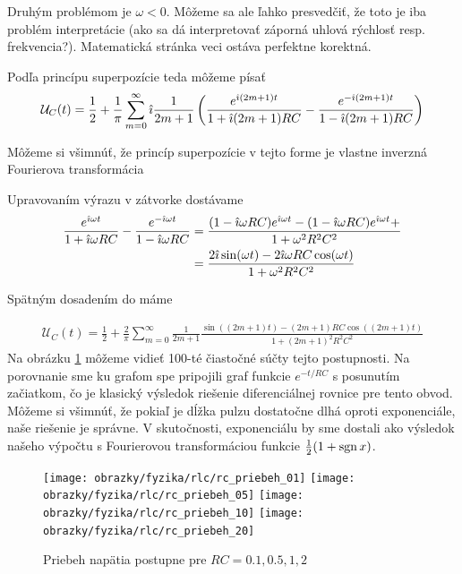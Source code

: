 Druhým problémom je $\omega<0$. Môžeme sa ale ľahko presvedčiť, že
toto je iba problém interpretácie (ako sa dá interpretovať záporná
uhlová rýchlosť resp. frekvencia?). Matematická stránka veci ostáva
perfektne korektná.

Podľa princípu superpozície teda môžeme písať
\begin{align}
    \mathcal{U}_C(t) = \frac{1}{2} +
        \frac{1}{\pi} \sum_{m=0}^{\infty}
            \hat{\imath} \frac{1}{2m+1} \left(
                \frac{e^{\hat{\imath} (2m+1) t} }{1 + \hat{\imath} (2m+1) RC} -
                \frac{e^{- \hat{\imath} (2m+1) t} }{1 - \hat{\imath} (2m+1) RC}
            \right)
\end{align}
\begin{poznamka}
    Môžeme si všimnúť, že princíp superpozície v tejto forme je
    vlastne inverzná Fourierova transformácia
\end{poznamka}
Upravovaním výrazu v zátvorke dostávame
\begin{equation}
    \begin{split}
    \frac{e^{\hat{\imath} \omega t}}{1 + \hat{\imath} \omega RC} -
    \frac{e^{- \hat{\imath} \omega t}}{1 - \hat{\imath} \omega RC}  &= 
    \frac{ (1-\hat{\imath} \omega RC) e^{\hat{\imath} \omega t} -
           (1-\hat{\imath} \omega RC) e^{\hat{\imath} \omega t} +
    }{1 + \omega^2 R^2 C^2} \\&=
    \frac{2 \hat{\imath} \sin (\omega t) - 2 \hat{\imath} \omega RC \cos(\omega t)}{1 + \omega^2 R^2 C^2}
    \end{split}
\end{equation}

Spätným dosadením do  máme

\begin{align}
    \mathcal{U}_C(t) = \frac{1}{2} +
        \frac{2}{\pi} \sum_{m=0}^{\infty} \frac{1}{2m+1}
         \frac{\sin ((2m+1) t) - (2m+1) RC \cos((2m+1)t)}
         {1+(2m+1)^2 R^2 C^2}
\end{align}
Na obrázku \ref{fig:rc_priebeh} môžeme vidieť 100-té čiastočné súčty
tejto postupnosti. Na porovnanie sme ku grafom spe pripojili graf funkcie
$e^{-t/RC}$ s posunutím začiatkom, čo je klasický výsledok riešenie
diferenciálnej rovnice pre tento obvod. Môžeme si všimnúť, že pokiaľ
je dĺžka pulzu dostatočne dlhá oproti exponenciále, naše riešenie je
správne. V skutočnosti, exponenciálu by sme dostali ako výsledok
našeho výpočtu s Fourierovou transformáciou funkcie 
$\frac{1}{2} (1+\operatorname{sgn} x)$.

\begin{figure}[htp]
    \centering
    \texttt{[image: obrazky/fyzika/rlc/rc\_priebeh\_01]}
    \texttt{[image: obrazky/fyzika/rlc/rc\_priebeh\_05]}
    \texttt{[image: obrazky/fyzika/rlc/rc\_priebeh\_10]}
    \texttt{[image: obrazky/fyzika/rlc/rc\_priebeh\_20]}
    \caption{Priebeh napätia postupne pre $RC=0.1,0.5,1,2$}
    \label{fig:rc_priebeh}
\end{figure}

